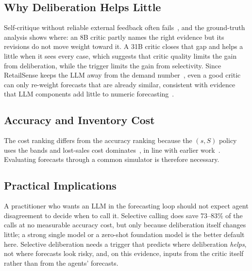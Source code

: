 \documentclass[conference]{IEEEtran}
\begin{document}
\subsection{Why Deliberation Helps Little}
Self-critique without reliable external feedback often fails~\cite{huang2024}, and the ground-truth
analysis shows where: an 8B critic partly names the right evidence but its revisions do not move
weight toward it. A 31B critic closes that gap and helps a little when it sees every case, which
suggests that critic quality limits the gain from deliberation, while the trigger limits the gain
from selectivity. Since RetailSense keeps the LLM away from the demand number~\cite{gruver2023,jin2024},
even a good critic can only re-weight forecasts that are already similar, consistent with evidence that
LLM components add little to numeric forecasting~\cite{tan2024}.

\subsection{Accuracy and Inventory Cost}
The cost ranking differs from the accuracy ranking because the $(s,S)$ policy uses the bands and
lost-sales cost dominates~\cite{silver2017}, in line with earlier
work~\cite{syntetos2010,kourentzes2020}. Evaluating forecasts through a common simulator is
therefore necessary.

\subsection{Practical Implications}
A practitioner who wants an LLM in the forecasting loop should not expect agent disagreement to
decide when to call it. Selective calling does save 73--83\% of the calls at no measurable accuracy
cost, but only because deliberation itself changes little; a strong single model or a zero-shot
foundation model is the better default here. Selective deliberation needs a trigger that predicts
where deliberation \emph{helps}, not where forecasts look risky, and, on this evidence, inputs from
the critic itself rather than from the agents' forecasts.
\end{document}
